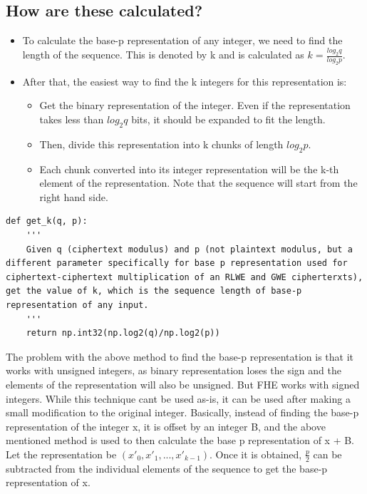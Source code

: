 \documentclass{report}
\begin{document}
	\subsection{How are these calculated?}
	\begin{itemize}
		\item To calculate the base-p representation of any integer, we need to find the length of the sequence. This is denoted by k and is calculated as $k = \frac{log_2 q}{log_2 p}$.
		\item After that, the easiest way to find the k integers for this representation is:
		\begin{itemize}
			\item Get the binary representation of the integer. Even if the representation takes less than $log_2 q$ bits, it should be expanded to fit the length.
			\item Then, divide this representation into k chunks of length $log_2 p$.
			\item Each chunk converted into its integer representation will be the k-th element of the representation. Note that the sequence will start from the right hand side.
		\end{itemize}
	\end{itemize}
\begin{verbatim}
def get_k(q, p):
	'''
	Given q (ciphertext modulus) and p (not plaintext modulus, but a different parameter specifically for base p representation used for ciphertext-ciphertext multiplication of an RLWE and GWE cipherterxts), get the value of k, which is the sequence length of base-p representation of any input.
	'''
	return np.int32(np.log2(q)/np.log2(p))
\end{verbatim}
	The problem with the above method to find the base-p representation is that it works with unsigned integers, as binary representation loses the sign and the elements of the representation will also be unsigned. But FHE works with signed integers. While this technique cant be used as-is, it can be used after making a small modification to the original integer.  Basically, instead of finding the base-p representation of the integer x, it is offset by an integer B, and the above mentioned method is used to then calculate the base p representation of x + B. Let the representation be $(x'_0, x'_1, ..., x'_{k-1})$. Once it is obtained, $\frac{p}{2}$ can be subtracted from the individual elements of the sequence to get the base-p representation of x.
	
\end{document}
